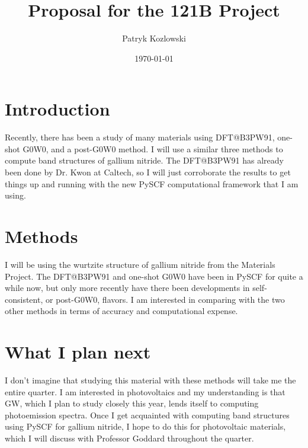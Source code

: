 \documentclass[12pt]{article}
\title{Proposal for the 121B Project}
\author{Patryk Kozlowski}
\date{\today}
\begin{document}
\maketitle
\section{Introduction}
Recently, there has been a study of many materials using DFT@B3PW91, one-shot G0W0, and a post-G0W0 method. \autocite{crowley_resolution_2016} I will use a similar three methods to compute band structures of gallium nitride. The DFT@B3PW91 has already been done by Dr. Kwon at Caltech, so I will just corroborate the results to get things up and running with the new PySCF computational framework that I am using.
\section{Methods}
I will be using the wurtzite structure of gallium nitride from the Materials Project. \autocite{noauthor_mp-804_nodate} The DFT@B3PW91 and one-shot G0W0 have been in PySCF for quite a while now, but only more recently have there been developments in self-consistent, or post-G0W0, flavors. \autocite{lei_gaussian-based_2022} I am interested in comparing with the two other methods in terms of accuracy and computational expense.
\section{What I plan next}
I don't imagine that studying this material with these methods will take me the entire quarter. I am interested in photovoltaics and my understanding is that GW, which I plan to study closely this year, lends itself to computing photoemission spectra. Once I get acquainted with computing band structures using PySCF for gallium nitride, I hope to do this for photovoltaic materials, which I will discuss with Professor Goddard throughout the quarter.
\printbibliography
\end{document}
